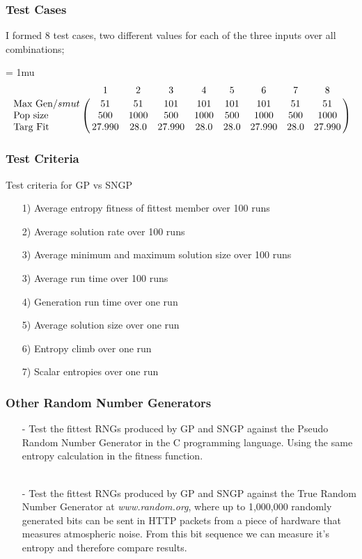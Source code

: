 \documentclass{beamer}
\begin{document}
\newcommand\scalemath[2]{\scalebox{#1}{\mbox{\ensuremath{\displaystyle #2}}}}
\begin{frame}
\frametitle{Test Cases}
I formed 8 test cases, two different values for each of the three inputs over all combinations;

\footnotesize
\arraycolsep=3pt %
\medmuskip = 1mu %
\[ \bordermatrix{~ &  1&  2& 3& 4& 5 & 6 & 7 & 8\cr
                  $Max Gen/$smut& 51 & 51 & 101 & 101& 101 & 101 & 51 & 51   \cr
                  $Pop size$& 500 & 1000 & 500 & 1000 & 500 & 1000 & 500 & 1000  \cr
	       $Targ Fit$ & 27.990 & 28.0 & 27.990 & 28.0 & 28.0 & 27.990 & 28.0 & 27.990 \cr}
\]

\end{frame}


\begin{frame}
\frametitle{Test Criteria}
Test criteria for GP vs SNGP
\begin{itemize}
  \item[1)]
  Average entropy fitness of fittest member over 100 runs
  \item[2)]
  Average solution rate over 100 runs
  \item[3)]
 Average minimum and maximum solution size over 100 runs
  \item[3)]
Average run time over 100 runs
  \item[4)]
Generation run time over one run
  \item[5)]
Average solution size over one run
  \item[6)]
Entropy climb over one run
  \item[7)]
 Scalar entropies over one run
\end{itemize}
\end{frame}

\begin{frame}
\frametitle{Other Random Number Generators}
\begin{itemize}
\item[-]Test the fittest RNGs produced by GP and SNGP against the Pseudo Random Number Generator in the C programming language. Using the same entropy calculation in the fitness function.\\~\\
\item[-]Test the fittest RNGs produced by GP and SNGP against the True Random Number Generator at \emph{www.random.org}, where up to 1,000,000 randomly generated bits can be sent in HTTP packets from a piece of hardware that measures atmospheric noise. From  this bit sequence we can measure it's entropy and therefore compare results.
\end{itemize}
\end{frame}
\end{document}
